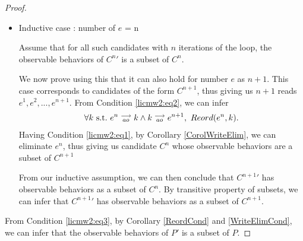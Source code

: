 \begin{proof}
\begin{itemize}
        \item Inductive case : number of $e$ = n

        Assume that for all such candidates with $n$ iterations of the loop, the observable behaviors of $C^{n}'$ is a subset of $C^n$.

        We now prove using this that it can also hold for number $e$ as $n + 1$. 
        This case corresponds to candidates of the form $C^{n+1}$, thus giving us $n+1$ reads $e^1, e^2,...,e^{n+1}$.
        From Condition \ref{licmw2:eq2}, we can infer 
        \begin{align*}
            \forall k \ \text{s.t.} \ e^n\stackrel{\longrightarrow}{_{ao}}k \wedge k\stackrel{\longrightarrow}{_{ao}}e^{n+1}, \ Reord(e^{n}, k).
        \end{align*}
        Having Condition \ref{licmw2:eq1}, by Corollary \ref{CorolWriteElim}, we can eliminate $e^{n}$, thus giving us candidate $C^{n}$ whose observable behaviors are a subset of $C^{n+1}$

        From our inductive assumption, we can then conclude that $C^{n+1}'$ has observable behaviors as a subset of $C^n$. 
        By transitive property of subsets, we can infer that $C^{n+1}'$ has observable behaviors as a subset of $C^{n+1}$.

    \end{itemize}
    
    From Condition \ref{licmw2:eq3}, by Corollary \ref{ReordCond} and \ref{WriteElimCond}, we can infer that the observable behaviors of $P'$ is a subset of $P$.

\end{proof}
